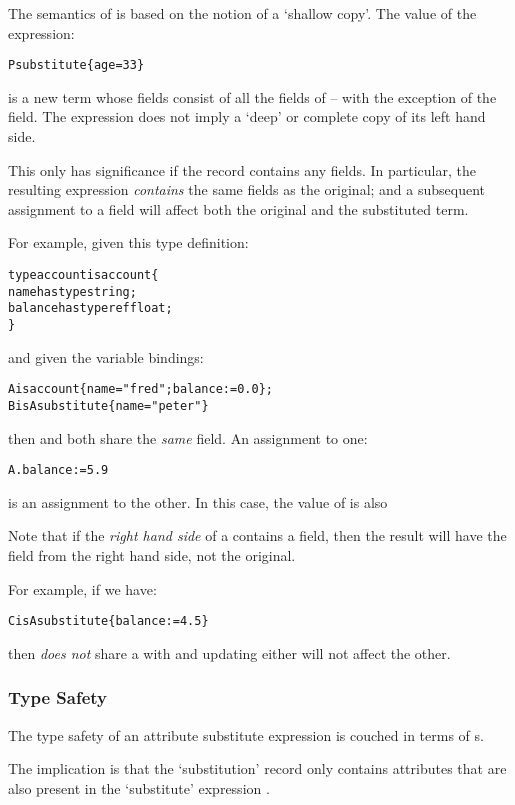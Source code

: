 \noindent
The semantics of  is based on the notion of a `shallow copy'. The value of the expression:
\begin{alltt}
P substitute \{ age=33 \}
\end{alltt}
is a new term whose fields consist of all the fields of  -- with the exception of the  field. The  expression does not imply a `deep' or complete copy of its left hand side. 
\begin{aside}
This only has significance if the record contains any  fields. In particular, the resulting expression \emph{contains} the same  fields as the original; and a subsequent assignment to a  field will affect both the original and the substituted term.

For example, given this type definition:
\begin{alltt}
type account is account\{
  name has type string;
  balance has type ref float;
\}
\end{alltt}
and given the variable bindings:
\begin{alltt}
A is account\{ name = "fred"; balance := 0.0 \};
B is A substitute \{ name = "peter" \}
\end{alltt}
then  and  both share the \emph{same}  field. An assignment to one:
\begin{alltt}
A.balance := 5.9
\end{alltt}
is an assignment to the other. In this case, the value of  is also 
\end{aside}
\begin{aside}
Note that if the \emph{right hand side} of a  contains a  field, then the result will have the  field from the right hand side, not the original.

For example, if we have:
\begin{alltt}
C is A substitute \{ balance := 4.5 \}
\end{alltt}
then  \emph{does not} share a  with  and updating either will not affect the other.
\end{aside}

\subsubsection{Type Safety}
The type safety of an attribute substitute expression is couched in terms of s.
\begin{prooftree}
\end{prooftree}
The implication is that the `substitution' record  only contains attributes that are also present in the `substitute' expression .

